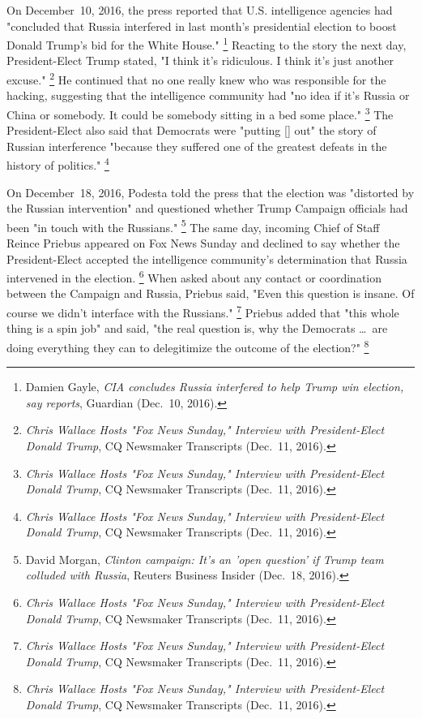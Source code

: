 On December~10, 2016, the press reported that U.S. intelligence agencies had "concluded that Russia interfered in last month's presidential election to boost Donald Trump's bid for the White House."%
\footnote{Damien Gayle, \textit{CIA concludes Russia interfered to help Trump win election, say reports}, Guardian (Dec.~10, 2016).}
Reacting to the story the next day, President-Elect Trump stated, "I think it's ridiculous.
I think it's just another excuse."%
\footnote{\textit{Chris Wallace Hosts "Fox News Sunday," Interview with President-Elect Donald Trump}, CQ Newsmaker Transcripts (Dec.~11, 2016).}
He continued that no one really knew who was responsible for the hacking, suggesting that the intelligence community had "no idea if it's Russia or China or somebody.
It could be somebody sitting in a bed some place."%
\footnote{\textit{Chris Wallace Hosts "Fox News Sunday," Interview with President-Elect Donald Trump}, CQ Newsmaker Transcripts (Dec.~11, 2016).}
The President-Elect also said that Democrats were "putting [] out" the story of Russian interference "because they suffered one of the greatest defeats in the history of politics."%
\footnote{\textit{Chris Wallace Hosts "Fox News Sunday," Interview with President-Elect Donald Trump}, CQ Newsmaker Transcripts (Dec.~11, 2016).}

On December~18, 2016, Podesta told the press that the election was "distorted by the Russian intervention" and questioned whether Trump Campaign officials had been "in touch with the Russians."%
\footnote{David Morgan, \textit{Clinton campaign: It's an 'open question' if Trump team colluded with Russia}, Reuters Business Insider (Dec.~18, 2016).}
The same day, incoming Chief of Staff Reince Priebus appeared on Fox News Sunday and declined to say whether the President-Elect accepted the intelligence community's determination that Russia intervened in the election.%
\footnote{\textit{Chris Wallace Hosts "Fox News Sunday," Interview with President-Elect Donald Trump}, CQ Newsmaker Transcripts (Dec.~11, 2016).}
When asked about any contact or coordination between the Campaign and Russia, Priebus said, "Even this question is insane.
Of course we didn't interface with the Russians."%
\footnote{\textit{Chris Wallace Hosts "Fox News Sunday," Interview with President-Elect Donald Trump}, CQ Newsmaker Transcripts (Dec.~11, 2016).}
Priebus added that "this whole thing is a spin job" and said, "the real question is, why the Democrats \dots\ are doing everything they can to delegitimize the outcome of the election?"%
\footnote{\textit{Chris Wallace Hosts "Fox News Sunday," Interview with President-Elect Donald Trump}, CQ Newsmaker Transcripts (Dec.~11, 2016).}

